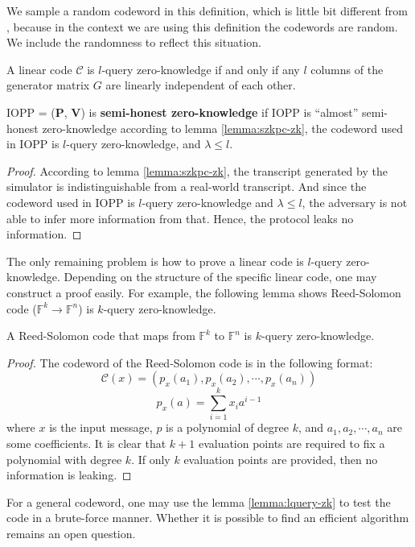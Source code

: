 We sample a random codeword in this definition, which is little bit different from \cite{BCL22}, because in the context we are using this definition the codewords are random. We include the randomness to reflect this situation.

\begin{lemma}
\label{lemma:lquery-zk}

A linear code $\mathcal{C}$ is $l$-query zero-knowledge if and only if any $l$ columns of the generator matrix $G$ are linearly independent of each other.

\end{lemma}

\begin{lemma}
\label{lemma:szkpc-zk-final}

IOPP = ($\textbf{P}$, $\textbf{V}$) is \textbf{semi-honest zero-knowledge} if IOPP is ``almost'' semi-honest zero-knowledge according to lemma \ref{lemma:szkpc-zk}, the codeword used in IOPP is $l$-query zero-knowledge, and $\lambda \le l$.

\end{lemma}
\begin{proof}

According to lemma \ref{lemma:szkpc-zk}, the transcript generated by the simulator is indistinguishable from a real-world transcript. And since the codeword used in IOPP is $l$-query zero-knowledge and $\lambda \le l$, the adversary is not able to infer more information from that. Hence, the protocol leaks no information.

\end{proof}

The only remaining problem is how to prove a linear code is $l$-query zero-knowledge. Depending on the structure of the specific linear code, one may construct a proof easily. For example, the following lemma shows Reed-Solomon code ($\mathbb{F}^k \rightarrow \mathbb{F}^n$) is $k$-query zero-knowledge.

\begin{lemma}
\label{lemma:rscode-kzk}

A Reed-Solomon code that maps from $\mathbb{F}^k$ to $\mathbb{F}^n$ is $k$-query zero-knowledge.

\end{lemma}
\begin{proof}

The codeword of the Reed-Solomon code is in the following format:
$$
\mathcal{C}(x) = 
(
p_x(a_1), p_x(a_2), \cdots, p_x(a_n)
)
$$
$$
p_x(a) = \sum_{i=1}^k x_i a^{i-1}
$$
where $x$ is the input message, $p$ is a polynomial of degree $k$, and $a_1, a_2, \cdots, a_n$ are some coefficients.
It is clear that $k+1$ evaluation points are required to fix a polynomial with degree $k$. If only $k$ evaluation points are provided, then no information is leaking.

\end{proof}

For a general codeword, one may use the lemma \ref{lemma:lquery-zk} to test the code in a brute-force manner. Whether it is possible to find an efficient algorithm remains an open question.